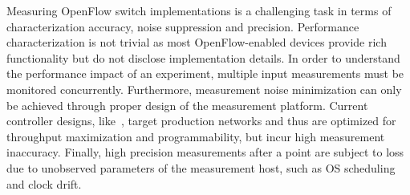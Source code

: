 Measuring OpenFlow switch implementations is a challenging task in terms 
of characterization accuracy, noise suppression and precision. 
Performance characterization is not trivial as most OpenFlow-enabled devices 
provide rich functionality but do not disclose implementation details. In order
to understand the performance impact of an experiment, multiple input 
measurements must be monitored concurrently. Furthermore, measurement noise
minimization can only be achieved through proper design of the measurement platform. 
Current controller designs, like~\cite{Gude08,SNAC}, target production networks
and thus are optimized for throughput maximization and programmability, 
but incur high measurement inaccuracy. Finally, high precision 
measurements after a point are subject to loss due to unobserved parameters 
of the measurement host, such as OS scheduling and clock drift. 
%



